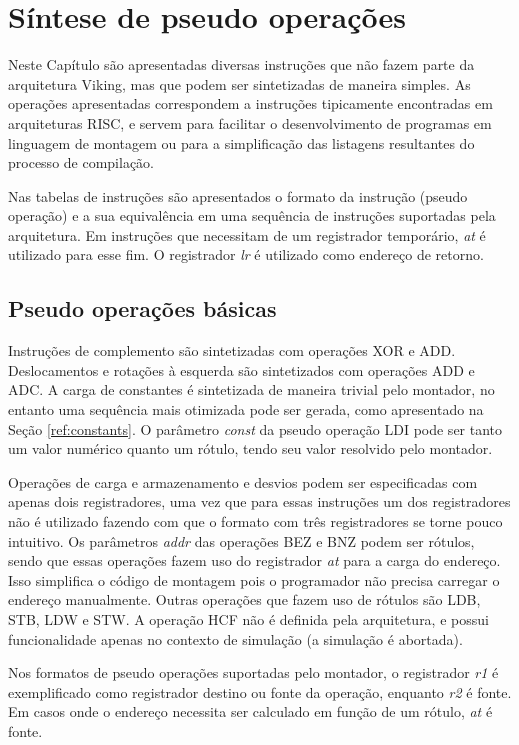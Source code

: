 \documentclass{extreport}
\begin{document}
\chapter{Síntese de pseudo operações}
\label{ref:pseudo_ops}

Neste Capítulo são apresentadas diversas instruções que não fazem parte da arquitetura Viking, mas que podem ser sintetizadas de maneira simples. As operações apresentadas correspondem a instruções tipicamente encontradas em arquiteturas RISC, e servem para facilitar o desenvolvimento de programas em linguagem de montagem ou para a simplificação das listagens resultantes do processo de compilação.

Nas tabelas de instruções são apresentados o formato da instrução (pseudo operação) e a sua equivalência em uma sequência de instruções suportadas pela arquitetura. Em instruções que necessitam de um registrador temporário, \textit{at} é utilizado para esse fim. O registrador \textit{lr} é utilizado como endereço de retorno.

\section{Pseudo operações básicas}

Instruções de complemento são sintetizadas com operações XOR e ADD. Deslocamentos e rotações à esquerda são sintetizados com operações ADD e ADC. A carga de constantes é sintetizada de maneira trivial pelo montador, no entanto uma sequência mais otimizada pode ser gerada, como apresentado na Seção \ref{ref:constants}. O parâmetro \textit{const} da pseudo operação LDI pode ser tanto um valor numérico quanto um rótulo, tendo seu valor resolvido pelo montador.

Operações de carga e armazenamento e desvios podem ser especificadas com apenas dois registradores, uma vez que para essas instruções um dos registradores não é utilizado fazendo com que o formato com três registradores se torne pouco intuitivo. Os parâmetros \textit{addr} das operações BEZ e BNZ podem ser rótulos, sendo que essas operações fazem uso do registrador \textit{at} para a carga do endereço. Isso simplifica o código de montagem pois o programador não precisa carregar o endereço manualmente. Outras operações que fazem uso de rótulos são LDB, STB, LDW e STW. A operação HCF não é definida pela arquitetura, e possui funcionalidade apenas no contexto de simulação (a simulação é abortada).

Nos formatos de pseudo operações suportadas pelo montador, o registrador \textit{r1} é exemplificado como registrador destino ou fonte da operação, enquanto \textit{r2} é fonte. Em casos onde o endereço necessita ser calculado em função de um rótulo, \textit{at} é fonte.
\end{document}
